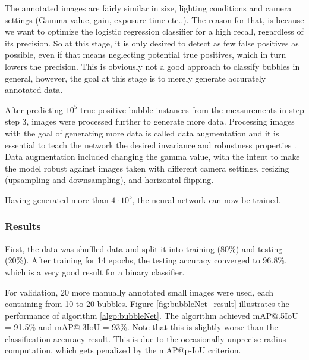 			The annotated images are fairly similar in size, lighting conditions and camera settings (Gamma value, gain, exposure time etc..). The reason for that, is because we want to optimize the logistic regression classifier for a high recall, regardless of its precision. So at this stage, it is only desired to detect as few false positives as possible, even if that means neglecting potential true positives, which in turn lowers the precision. This is obviously not a good approach to classify bubbles in general, however, the goal at this stage is to merely generate accurately annotated data. 
			
			After predicting $10^5$ true positive bubble instances from the measurements in step step 3, images were processed further to generate more data. Processing images with the goal of generating more data is called data augmentation and it is essential to teach the network the desired invariance and robustness properties \citep{UNet}. Data augmentation included changing the gamma value, with the intent to make the model robust against images taken with different camera settings, resizing (upsampling and downsampling), and horizontal flipping.
			
			Having generated more than $4 \cdot 10^5$, the neural network can now be trained. 
			
			
			
			


			
		\subsubsection{Results}
			
			First, the data was shuffled data and split it into training (80\%) and testing (20\%). After training for 14 epochs, the testing accuracy converged to 96.8\%, which is a very good result for a binary classifier. 
			
			For validation, 20 more manually annotated small images were used, each containing from 10 to 20 bubbles. Figure \ref{fig:bubbleNet_result} illustrates the performance of algorithm \ref{algo:bubbleNet}.  
			The algorithm achieved mAP@.5IoU = 91.5\% and mAP@.3IoU = 93\%. Note that this is slightly worse than the classification accuracy result. This is due to the occasionally unprecise radius computation, which gets penalized by the mAP@p-IoU criterion. 
			
